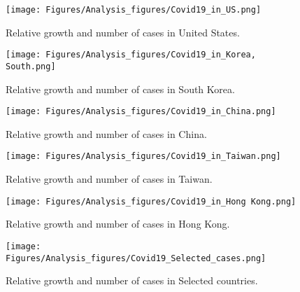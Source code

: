 \begin{figure}
    \centering
    \texttt{[image: Figures/Analysis\_figures/Covid19\_in\_US.png]}
    \caption{Relative growth and number of cases in United States.}\label{fig:US}
\end{figure}

\begin{figure}
    \centering
    \texttt{[image: Figures/Analysis\_figures/Covid19\_in\_Korea, South.png]}
    \caption{Relative growth and number of cases in South Korea.}\label{fig:SouthKorea}
\end{figure}

\begin{figure}
    \centering
    \texttt{[image: Figures/Analysis\_figures/Covid19\_in\_China.png]}
    \caption{Relative growth and number of cases in China.}\label{fig:China}
\end{figure}

\begin{figure}
    \centering
    \texttt{[image: Figures/Analysis\_figures/Covid19\_in\_Taiwan.png]}
    \caption{Relative growth and number of cases in Taiwan.}\label{fig:Taiwan}
\end{figure}

\begin{figure}
    \centering
    \texttt{[image: Figures/Analysis\_figures/Covid19\_in\_Hong Kong.png]}
    \caption{Relative growth and number of cases in Hong
    Kong.}\label{fig:HongKong}
\end{figure}

\begin{figure}
    \centering
    \texttt{[image: Figures/Analysis\_figures/Covid19\_Selected\_cases.png]}
    \caption{Relative growth and number of cases in Selected countries.}\label{fig:Selected}
\end{figure}
